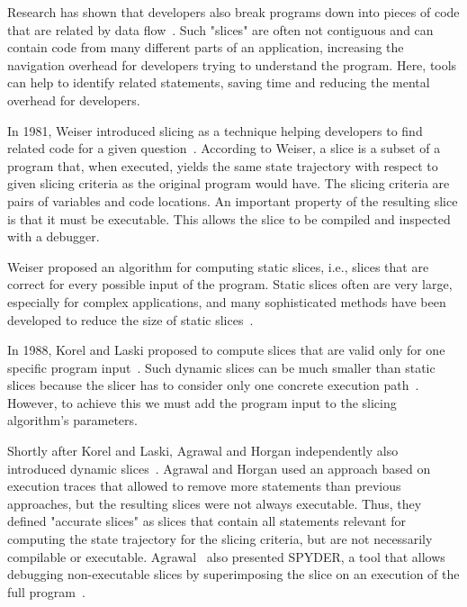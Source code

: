 Research has shown that developers also break programs down into pieces of code that are related by data flow~\cite{weiser82:programmers_use_slices_when}.
Such "slices" are often not contiguous and can contain code from many different parts of an application, increasing the navigation overhead for developers trying to understand the program.
Here, tools can help to identify related statements, saving time and reducing the mental overhead for developers.

In 1981, Weiser introduced slicing as a technique helping developers to find related code for a given question~\cite{weiser81:program_slicing}.
According to Weiser, a slice is a subset of a program that, when executed, yields the same state trajectory with respect to given slicing criteria as the original program would have.
The slicing criteria are pairs of variables and code locations.
An important property of the resulting slice is that it must be executable.
This allows the slice to be compiled and inspected with a debugger.

Weiser proposed an algorithm for computing static slices, i.e., slices that are correct for every possible input of the program.
Static slices often are very large, especially for complex applications, and many sophisticated methods have been developed to reduce the size of static slices~\cite{ottenstein84:the_program_dependence_graph, lyle93:program_slicing_in, hoffner95:evaluation_and_comparison}.

In 1988, Korel and Laski proposed to compute slices that are valid only for one specific program input~\cite{korel88:dynamic_program_slicing}.
Such dynamic slices can be much smaller than static slices because the slicer has to consider only one concrete execution path~\cite{venkatesh95:experimental_results_from_dynamic, hoffner95:evaluation_and_comparison}.
However, to achieve this we must add the program input to the slicing algorithm's parameters.

Shortly after Korel and Laski, Agrawal and Horgan independently also introduced dynamic slices~\cite{agrawal90:dynamic_program_slicing}.
Agrawal and Horgan used an approach based on execution traces that allowed to remove more statements than previous approaches, but the resulting slices were not always executable.
Thus, they defined "accurate slices" as slices that contain all statements relevant for computing the state trajectory for the slicing criteria, but are not necessarily compilable or executable.
Agrawal \etal\ also presented SPYDER, a tool that allows debugging non-executable slices by superimposing the slice on an execution of the full program~\cite{agrawal93:debugging_with_dynamic_slicing}.

